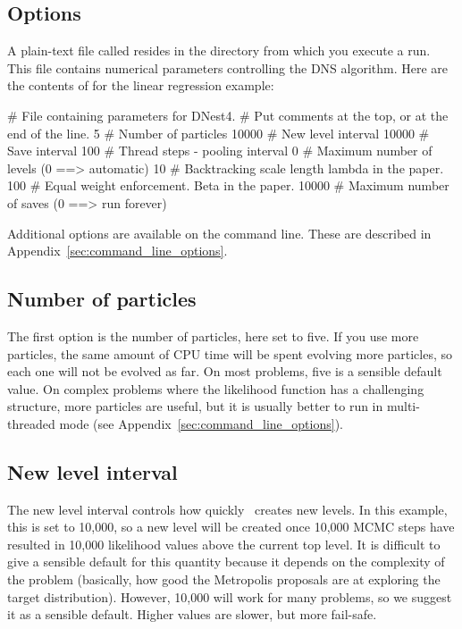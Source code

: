 \documentclass[article]{jss}
\newcommand{\dnest}{\pkg{DNest4}}
\begin{document}
\subsection{Options}\label{sec:options}
A plain-text file called  resides in the directory from which you
execute a run. This file contains numerical parameters controlling the
DNS algorithm. Here are the contents of  for the linear
regression example:
%
\begin{CodeChunk}
\begin{CodeInput}
# File containing parameters for DNest4.
# Put comments at the top, or at the end of the line.
5       # Number of particles
10000   # New level interval
10000   # Save interval
100     # Thread steps - pooling interval
0       # Maximum number of levels (0 ==> automatic)
10      # Backtracking scale length lambda in the paper.
100     # Equal weight enforcement. Beta in the paper.
10000   # Maximum number of saves (0 ==> run forever)
\end{CodeInput}
\end{CodeChunk}
%
Additional options are available on the command line. These are
described in Appendix~\ref{sec:command_line_options}.

\subsection{Number of particles}
The first option is the number of particles, here set to five.
If you use more particles, the same amount of CPU time will be spent evolving more particles,
so each one will not be evolved as far. On most problems, five is a sensible
default value. On complex problems where the likelihood function has
a challenging structure, more particles are useful, but it is usually better
to run in multi-threaded mode (see Appendix~\ref{sec:command_line_options}).

\subsection{New level interval}
The new level interval controls how quickly \dnest~creates new levels. In this
example, this is set to 10,000, so a new level will be created once 10,000
MCMC steps have resulted in
10,000 likelihood values above the current top level.
It is difficult to give a sensible default for this
quantity because it depends on the complexity of the problem (basically,
how good the Metropolis proposals are at exploring the target distribution).
However, 10,000 will work for many problems, so we suggest it as a sensible
default. Higher values are slower, but more fail-safe.
\end{document}
